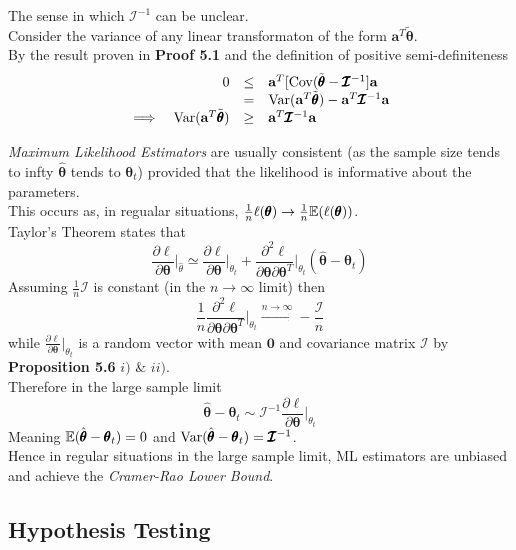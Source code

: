 \documentclass[11pt,a4paper]{article}
\begin{document}
The sense in which $\pmb{\mathcal{I}}^{-1}$ can be unclear.\\
Consider the variance of any linear transformaton of the form $\textbf{a}^T\tilde{\pmb\theta}$.\\
By the result proven in \textbf{Proof 5.1} and the definition of positive semi-definiteness
\[\begin{array}{rrcl}
&0&\leq&\textbf{a}^T[\mathrm{Cov}(\tilde{\pmb\theta}-\pmb{\mathcal{I}}^{-1}]\textbf{a}\\
&&=&\mathrm{Var}(\textbf{a}^T\tilde{\pmb\theta})-\textbf{a}^T\pmb{\mathcal{I}}^{-1}\textbf{a}\\
\implies&\mathrm{Var}(\textbf{a}^T\tilde{\pmb\theta})&\geq&\textbf{a}^T\pmb{\mathcal{I}}^{-1}\textbf{a}
\end{array}\]

\textit{Maximum Likelihood Estimators} are usually consistent (\ie as the sample size tends to infty $\hat{\pmb\theta}$ tends to $\pmb\theta_t$) provided that the likelihood is informative about the parameters.\\
This occurs as, in regualar situations, $\frac1n\ell(\pmb\theta)\to\frac1n\mathbb{E}(\ell(\pmb\theta))$.\\

Taylor's Theorem states that
$$\frac{\partial\ell}{\partial\pmb\theta}\bigg|_{\hat\theta}\simeq\frac{\partial\ell}{\partial\pmb\theta}\bigg|_{\theta_t}+\dfrac{\partial^2\ell}{\partial\pmb\theta\partial{\pmb\theta}^T}\bigg|_{\theta_t}(\hat{\pmb\theta}-\pmb\theta_t)$$
Assuming $\frac1n\pmb{\mathcal{I}}$ is constant (in the $n\to\infty$ limit) then
$$\frac1n\frac{\partial^2\ell}{\partial\pmb\theta\partial\pmb{\theta}^T}\bigg|_{\theta_t}\overset{n\to\infty}{\longrightarrow}-\frac{\pmb{\mathcal{I}}}{n}$$
while $\frac{\partial\ell}{\partial\pmb\theta}\big|_{\theta_t}$ is a random vector with mean $\pmb0$ and covariance matrix $\pmb{\mathcal{I}}$ by \textbf{Proposition 5.6} $i)$ \& $ii)$.\\
Therefore in the large sample limit
$$\hat{\pmb\theta}-\pmb\theta_t\sim\pmb{\mathcal{I}}^{-1}\frac{\partial\ell}{\partial\pmb\theta}\bigg|_{\theta_t}$$
Meaning $\mathbb{E}(\hat{\pmb\theta}-\pmb\theta_t)=0$ and $\mathrm{Var}(\hat{\pmb\theta}-\pmb\theta_t)=\pmb{\mathcal{I}}^{-1}$.\\
Hence in regular situations in the large sample limit, ML estimators are unbiased and achieve the \textit{Cramer-Rao Lower Bound}.

\subsection{Hypothesis Testing}
\end{document}
